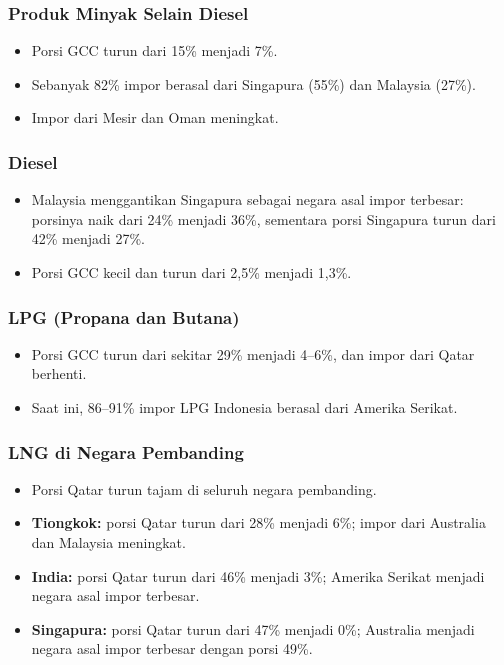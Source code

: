 \documentclass[
  manuscript=article,
  layout=brief,
  year=2026,
  volume=1,
]{den}
\providecommand{\tightlist}{%
  \setlength{\itemsep}{0pt}\setlength{\parskip}{0pt}}
\begin{document}
\subsubsection{Produk Minyak Selain
Diesel}\label{produk-minyak-selain-diesel}

\begin{itemize}
\tightlist
\item
  Porsi GCC turun dari 15\% menjadi 7\%.
\item
  Sebanyak 82\% impor berasal dari Singapura (55\%) dan Malaysia (27\%).
\item
  Impor dari Mesir dan Oman meningkat.
\end{itemize}

\subsubsection{Diesel}\label{diesel}

\begin{itemize}
\tightlist
\item
  Malaysia menggantikan Singapura sebagai negara asal impor terbesar:
  porsinya naik dari 24\% menjadi 36\%, sementara porsi Singapura turun
  dari 42\% menjadi 27\%.
\item
  Porsi GCC kecil dan turun dari 2,5\% menjadi 1,3\%.
\end{itemize}

\subsubsection{LPG (Propana dan Butana)}\label{lpg-propana-dan-butana}

\begin{itemize}
\tightlist
\item
  Porsi GCC turun dari sekitar 29\% menjadi 4--6\%, dan impor dari Qatar
  berhenti.
\item
  Saat ini, 86--91\% impor LPG Indonesia berasal dari Amerika Serikat.
\end{itemize}

\subsubsection{LNG di Negara Pembanding}\label{lng-di-negara-pembanding}

\begin{itemize}
\tightlist
\item
  Porsi Qatar turun tajam di seluruh negara pembanding.
\item
  \textbf{Tiongkok:} porsi Qatar turun dari 28\% menjadi 6\%; impor dari
  Australia dan Malaysia meningkat.
\item
  \textbf{India:} porsi Qatar turun dari 46\% menjadi 3\%; Amerika
  Serikat menjadi negara asal impor terbesar.
\item
  \textbf{Singapura:} porsi Qatar turun dari 47\% menjadi 0\%; Australia
  menjadi negara asal impor terbesar dengan porsi 49\%.
\end{itemize}
\end{document}
